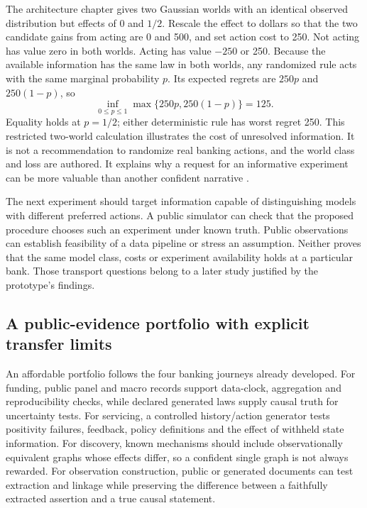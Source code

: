 The architecture chapter gives two Gaussian worlds with an identical observed
distribution but effects of 0 and $1/2$. Rescale the effect to dollars so that
the two candidate gains from acting are 0 and 500, and set action cost to 250.
Not acting has value zero in both worlds. Acting has value $-250$ or 250.
Because the available information has the same law in both worlds, any
randomized rule acts with the same marginal probability $p$. Its expected
regrets are $250p$ and $250(1-p)$, so
\begin{equation}
 \inf_{0\leq p\leq1}\max\{250p,250(1-p)\}=125.
 \label{exec13:frontier-minimax}
\end{equation}
Equality holds at $p=1/2$; either deterministic rule has worst regret 250.
This restricted two-world calculation illustrates the cost of unresolved
information. It is not a recommendation to randomize real banking actions,
and the world class and loss are authored. It explains why a request for an
informative experiment can be more valuable than another confident narrative
\citep{exec13_architecture_exact,exec13_frontier_exact}.

The next experiment should target information capable of distinguishing models
with different preferred actions. A public simulator can check that the
proposed procedure chooses such an experiment under known truth. Public
observations can establish feasibility of a data pipeline or stress an
assumption. Neither proves that the same model class, costs or experiment
availability holds at a particular bank. Those transport questions belong to
a later study justified by the prototype's findings.

\subsection{A public-evidence portfolio with explicit transfer limits}

An affordable portfolio follows the four banking journeys already developed.
For funding, public panel and macro records support data-clock, aggregation
and reproducibility checks, while declared generated laws supply causal truth
for uncertainty tests. For servicing, a controlled history/action generator
tests positivity failures, feedback, policy definitions and the effect of
withheld state information. For discovery, known mechanisms should include
observationally equivalent graphs whose effects differ, so a confident single
graph is not always rewarded. For observation construction, public or generated
documents can test extraction and linkage while preserving the difference
between a faithfully extracted assertion and a true causal statement.

